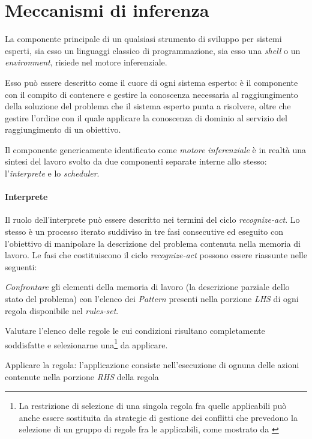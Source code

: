 \section{Meccanismi di inferenza}
La componente principale di un qualsiasi strumento di sviluppo per sistemi esperti, sia esso un linguaggi classico di programmazione, sia esso una \emph{shell} o un \emph{environment}, risiede nel motore inferenziale.

Esso può essere descritto come il cuore di ogni sistema esperto: è il componente con il compito di contenere e gestire la conoscenza necessaria al raggiungimento della soluzione del problema che il sistema esperto punta a risolvere, oltre che gestire l'ordine con il quale applicare la conoscenza di dominio al servizio del raggiungimento di un obiettivo.

Il componente genericamente identificato come \emph{motore inferenziale} è in realtà una sintesi del lavoro svolto da due componenti separate interne allo stesso: l'\emph{interprete} e lo \emph{scheduler}\cite{development1993}.

\paragraph{Interprete} Il ruolo dell'interprete può essere descritto nei termini del ciclo \emph{recognize-act}. Lo stesso è un processo iterato suddiviso in tre fasi consecutive ed eseguito con l'obiettivo di manipolare la descrizione del problema contenuta nella memoria di lavoro. Le fasi che costituiscono il ciclo \emph{recognize-act} possono essere riassunte nelle seguenti:
\begin{list}{}{}
	\item[(1)] \emph{Confrontare} gli elementi della memoria di lavoro (la descrizione parziale dello stato del problema) con l'elenco dei \emph{Pattern} presenti nella porzione \emph{LHS} di ogni regola disponibile nel \emph{rules-set}.
	\item[(2)] Valutare l'elenco delle regole le cui condizioni risultano completamente soddisfatte e selezionarne una\footnote{La restrizione di selezione di una singola regola fra quelle applicabili può anche essere sostituita da strategie di gestione dei conflitti che prevedono la selezione di un gruppo di regole fra le applicabili, come mostrato da \cite{Doorenbos95productionmatching}} da applicare.
	\item[(3)] Applicare la regola: l'applicazione consiste nell'esecuzione di ognuna delle azioni contenute nella porzione \emph{RHS} della regola
\end{list}

